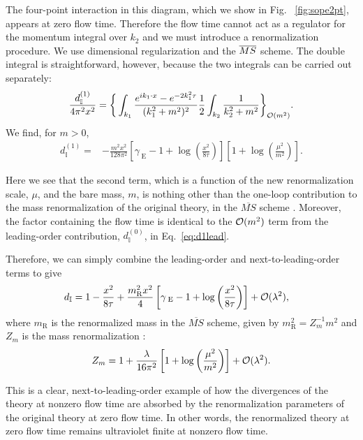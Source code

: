 The four-point interaction in this diagram, which we show in Fig.~
\ref{fig:sope2pt}, appears at zero flow time. Therefore the flow 
time cannot act as a regulator for the momentum integral over $k_2$ and we must 
introduce a renormalization procedure. We use dimensional regularization and 
the $\overline{MS}$ scheme. The double integral is straightforward, however, because the 
two integrals can be carried out separately:
\begin{equation}\label{eq:d11loop}
\frac{d_{\mathbb{I}}^{(1)}}{4\pi^2x^2}=  \bigg\{\int_{k_1}
\frac{e^{ik_1 \cdot 
x} - e^{- 2k_1^2\tau}}{(k_1^2+m^2)^2}  
\frac{1}{2}\int_{k_2}\frac{1}{k_2^2+m^2}\bigg\}_{{
 \cal O}(m^2)}.
\end{equation}
We find, for $m>0$,
\begin{align}
d_{\mathbb{I}}^{(1)} = {} & -
\frac{m^2x^2}{128\pi^2}\left[\gamma_{\;\mathrm{E}}-1+\log\left(\frac{x^2}{
8\tau } \right)\right]\left[
1+ \log\left(\frac{\mu^2}{m^2}\right)\right].
\end{align}

Here we see that the second term, which is a function of the new 
renormalization scale, $\mu$, and the bare mass, $m$, is nothing other than the 
one-loop contribution to the mass renormalization of the original theory, in 
the $\overline{MS}$ scheme \cite{Kleinert:2001ax}. Moreover, the factor 
containing the flow time 
is identical to the ${\cal O}(m^2)$ term from the leading-order contribution, 
$d_{\mathbb{I}}^{(0)}$, in Eq.~\eqref{eq:d1lead}.

Therefore, we can simply combine the leading-order and next-to-leading-order 
terms to give
\begin{align}
d_{\mathbb{I}} = {} & 1 -
\frac{x^2}{8\tau}  +\frac{m_{\mathrm{R}}^2x^2}{4}\left[\gamma_{\;\mathrm{E}} -1 
+ 
\log\left(\frac{x^2}{8\tau}\right)\right]  +{\cal O}(\lambda^2),
\end{align}
where $m_{\mathrm{R}}$ is the renormalized mass in the 
$\overline{MS}$ scheme, given by $m^2_{\mathrm{R}} = Z_m^{-1}m^2$ and $Z_m$ is 
the mass renormalization \cite{Kleinert:2001ax}:
\begin{equation}
Z_m = 1+\frac{\lambda}{16\pi^2}\left[
1+ \log\left(\frac{\mu^2}{m^2}\right)\right]+{\cal O}(\lambda^2).
\end{equation}

This is a clear, next-to-leading-order example of how the 
divergences of the theory at nonzero flow time are absorbed by 
the renormalization parameters of the original theory at zero flow time. In 
other words, the renormalized theory at zero flow time remains ultraviolet 
finite at nonzero flow time.


